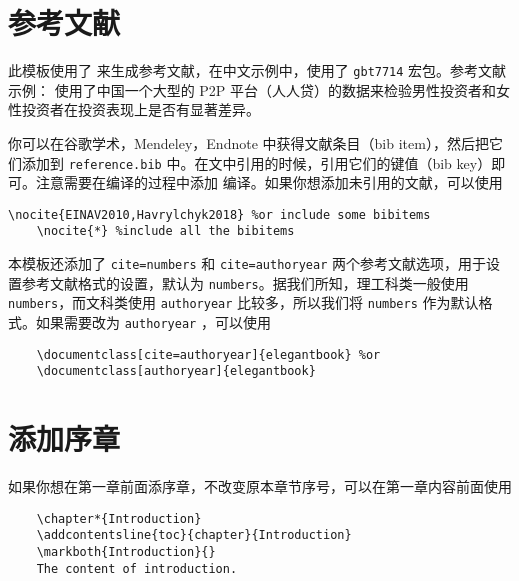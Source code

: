 	\section{参考文献}
	
	此模板使用了  来生成参考文献，在中文示例中，使用了 \lstinline{gbt7714} 宏包。参考文献示例：\cite{en1,en2,en3} 使用了中国一个大型的 P2P 平台（人人贷）的数据来检验男性投资者和女性投资者在投资表现上是否有显著差异。
	
	你可以在谷歌学术，Mendeley，Endnote 中获得文献条目（bib item），然后把它们添加到 \lstinline{reference.bib} 中。在文中引用的时候，引用它们的键值（bib key）即可。注意需要在编译的过程中添加  编译。如果你想添加未引用的文献，可以使用
	\begin{lstlisting}[frame=single]
	\nocite{EINAV2010,Havrylchyk2018} %or include some bibitems
	\nocite{*} %include all the bibitems
	\end{lstlisting}
	
	本模板还添加了 \lstinline{cite=numbers} 和 \lstinline{cite=authoryear} 两个参考文献选项，用于设置参考文献格式的设置，默认为 \lstinline{numbers}。据我们所知，理工科类一般使用 \lstinline{numbers}，而文科类使用 \lstinline{authoryear} 比较多，所以我们将 \lstinline{numbers} 作为默认格式。如果需要改为  \lstinline{authoryear} ，可以使用
	\begin{lstlisting}
	\documentclass[cite=authoryear]{elegantbook} %or
	\documentclass[authoryear]{elegantbook}
	\end{lstlisting}
	
	\section{添加序章}
	
	如果你想在第一章前面添序章，不改变原本章节序号，可以在第一章内容前面使用 
	\begin{lstlisting}
	\chapter*{Introduction}
	\addcontentsline{toc}{chapter}{Introduction} 
	\markboth{Introduction}{} 
	The content of introduction.
	\end{lstlisting}
	
